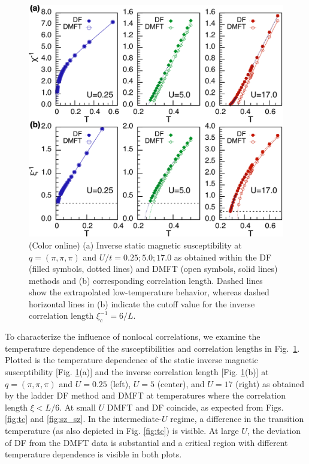 \documentclass[aps,prb,twocolumn,amsmath,notitlepage,floatfix,footinbib,superscriptaddress,showpacs, showkeys]{revtex4-1}
\begin{document}
\begin{figure}[t]
\begin{center}
\includegraphics[width=\columnwidth]{fig4.pdf}\end{center}\vspace*{-1.5em}
\caption{(Color online) (a) Inverse static magnetic susceptibility at $q=(\pi, \pi, \pi)$ and $U/t=0.25; 5.0; 17.0$ as obtained within the DF (filled symbols, dotted lines) and DMFT (open symbols, solid lines) methods and (b) corresponding correlation length. Dashed lines show the extrapolated low-temperature behavior, whereas dashed horizontal lines in (b) indicate the cutoff value for the inverse correlation length $\xi^{-1}_c=6/L$.}
\label{fig:df_dmft_susc}
\end{figure}

To characterize the influence of nonlocal correlations, we examine the temperature dependence of the susceptibilities and correlation lengths in Fig.~\ref{fig:df_dmft_susc}. 
Plotted is the temperature dependence of the static inverse magnetic susceptibility [Fig. \ref{fig:df_dmft_susc}(a)] and the inverse correlation length [Fig. \ref{fig:df_dmft_susc}(b)] at $q=(\pi, \pi, \pi)$ and $U = 0.25$ (left), $U = 5$ (center), and $U = 17$ (right) as obtained by the ladder DF method and DMFT at temperatures where the correlation length $\xi < L/6$. 
At small $U$ DMFT and DF coincide, as expected from Figs. \ref{fig:tc} and \ref{fig:sz_sz}. In the intermediate-$U$ regime, a difference in the transition temperature (as also depicted in Fig. \ref{fig:tc}) is visible. 
At large $U$, the deviation of DF from the DMFT data is substantial and a critical region with different temperature dependence is visible in both plots. 
\end{document}
